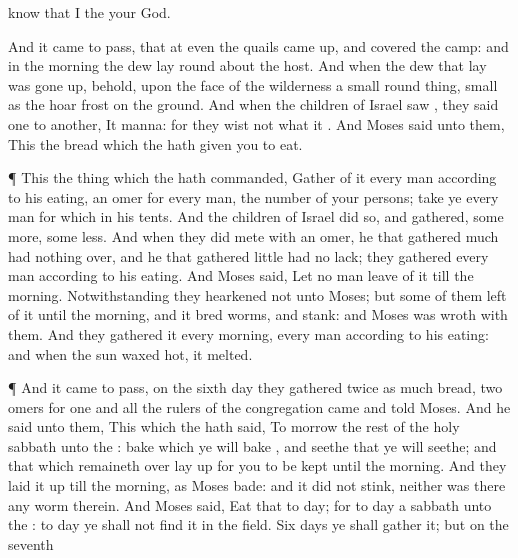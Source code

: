 {know that I
{} the
{} your
God.
\par }{\PP {}And it came to pass, that at
even the
quails came
up, and
covered the
camp: and in the
morning the
dew
lay round
about the
host.
And when the
dew that
lay was gone
up, behold, upon the
face of the
wilderness
{} a
small round
thing,
{}
small as the hoar
frost on the
ground.
And when the
children of
Israel
saw
{}, they
said
one to
another, It
{}
manna: for they
wist not what it
{}. And
Moses
said unto them, This
{} the
bread which the
{} hath
given you to
eat.
\par }{\PP {}¶ This
{} the
thing
which the
{} hath
commanded,
Gather of it every
man
according to his
eating, an
omer for every
man,
{} the
number of your
persons;
take ye every
man for
{} which
{} in his
tents.
And the
children of
Israel
did so, and
gathered, some
more, some
less.
And when they did
mete
{} with an
omer, he that gathered
much had nothing
over, and he that gathered
little had no
lack; they
gathered every
man
according to his
eating.
And
Moses
said, Let no
man
leave of it till the
morning.
Notwithstanding they
hearkened not unto
Moses; but
some of them
left of it until the
morning, and it
bred
worms, and
stank: and
Moses was
wroth with them.
And they
gathered it every
morning, every
man
according to his
eating: and when the
sun waxed
hot, it
melted.
\par }{\PP {}¶ And it came to pass,
{} on the
sixth
day they
gathered
twice as much
bread,
two
omers for
one
{} and all the
rulers of the
congregation
came and
told
Moses.
And he
said unto them, This
{} which the
{} hath
said, To
morrow
{} the
rest of the
holy
sabbath unto the
{}:
bake
{} which ye will
bake
{}, and
seethe that ye will
seethe; and that
which remaineth
over lay
up for you to be
kept until the
morning.
And they laid it
up till the
morning, as
Moses
bade: and it did not
stink, neither was there any
worm therein.
And
Moses
said,
Eat that to
day; for to
day
{} a
sabbath unto the
{}: to
day ye shall not
find it in the
field.
Six
days ye shall
gather it; but on the
seventh
}
